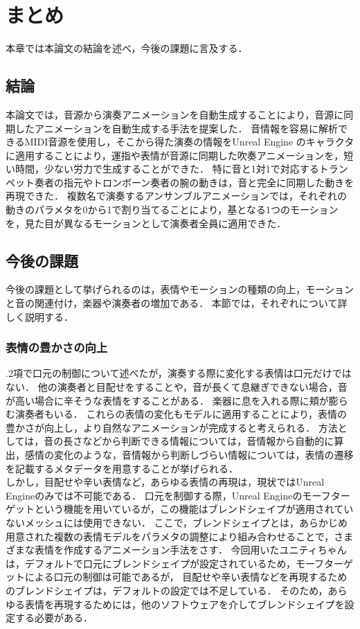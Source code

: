\chapter{まとめ}
\label{chap:conclusion}
本章では本論文の結論を述べ，今後の課題に言及する．

\section{結論}
本論文では，音源から演奏アニメーションを自動生成することにより，音源に同期したアニメーションを自動生成する手法を提案した．
音情報を容易に解析できるMIDI音源を使用し，そこから得た演奏の情報をUnreal Engine のキャラクタに適用することにより，運指や表情が音源に同期した吹奏アニメーションを，短い時間，少ない労力で生成することができた．
特に音と1対1で対応するトランペット奏者の指元やトロンボーン奏者の腕の動きは，音と完全に同期した動きを再現できた．
複数名で演奏するアンサンブルアニメーションでは，それぞれの動きのパラメタを0から1で割り当てることにより，基となる1つのモーションを，見た目が異なるモーションとして演奏者全員に適用できた．

\section{今後の課題}
今後の課題として挙げられるのは，表情やモーションの種類の向上，モーションと音の関連付け，楽器や演奏者の増加である．
本節では，それぞれについて詳しく説明する．

\subsection{表情の豊かさの向上}
{.2項}で口元の制御について述べたが，演奏する際に変化する表情は口元だけではない．
他の演奏者と目配せをすることや，音が長くて息継ぎできない場合，音が高い場合に辛そうな表情をすることがある．
楽器に息を入れる際に頬が膨らむ演奏者もいる．
これらの表情の変化もモデルに適用することにより，表情の豊かさが向上し，より自然なアニメーションが完成すると考えられる．
方法としては，音の長さなどから判断できる情報については，音情報から自動的に算出，感情の変化のような，音情報から判断しづらい情報については，表情の遷移を記載するメタデータを用意することが挙げられる．\\
\indent
しかし，目配せや辛い表情など，あらゆる表情の再現は，現状ではUnreal Engineのみでは不可能である．
口元を制御する際，Unreal Engineのモーフターゲットという機能を用いているが，この機能はブレンドシェイプが適用されていないメッシュには使用できない．
ここで，ブレンドシェイプとは，あらかじめ用意された複数の表情モデルをパラメタの調整により組み合わせることで，さまざまな表情を作成するアニメーション手法をさす．
今回用いたユニティちゃんは，デフォルトで口元にブレンドシェイプが設定されているため，モーフターゲットによる口元の制御は可能であるが，
目配せや辛い表情などを再現するためのブレンドシェイプは，デフォルトの設定では不足している．
そのため，あらゆる表情を再現するためには，他のソフトウェアを介してブレンドシェイプを設定する必要がある．

